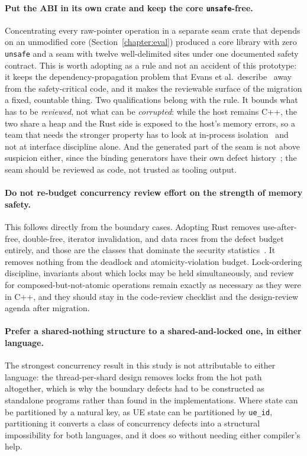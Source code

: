 \documentclass[english,twoside,openright,a4paper,censored,csm,software-track-2020]{HYthesisML}
\begin{document}
\paragraph{Put the ABI in its own crate and keep the core \texttt{unsafe}-free.}
Concentrating every raw-pointer operation in a separate seam crate that depends on an
unmodified core (Section~\ref{chapter:eval}) produced a core library with zero \texttt{unsafe}
and a seam with twelve well-delimited sites under one documented safety contract. This is
worth adopting as a rule and not an accident of this prototype: it keeps the
dependency-propagation problem that Evans et al.\ describe~\cite{evans2020rust} away from the
safety-critical code, and it makes the reviewable surface of the migration a fixed, countable
thing. Two qualifications belong with the rule. It bounds what has to be
\emph{reviewed}, not what can be \emph{corrupted}: while the host remains C++, the two share a
heap and the Rust side is exposed to the host's memory errors, so a team that needs the
stronger property has to look at in-process isolation~\cite{rivera2021galeed,kirth2022pkrusafe}
and not at interface discipline alone. And the generated part of the seam is not above
suspicion either, since the binding generators have their own defect
history~\cite{cai2026interop}; the seam should be reviewed as code, not trusted as tooling
output.

\paragraph{Do not re-budget concurrency review effort on the strength of memory safety.}
This follows directly from the boundary cases. Adopting Rust removes use-after-free,
double-free, iterator invalidation, and data races from the defect budget entirely, and those
are the classes that dominate the security statistics~\cite{msrc2019memory,google2022android}.
It removes nothing from the deadlock and atomicity-violation budget. Lock-ordering discipline,
invariants about which locks may be held simultaneously, and review for
composed-but-not-atomic operations remain exactly as necessary as they were in C++, and they
should stay in the code-review checklist and the design-review agenda after migration.

\paragraph{Prefer a shared-nothing structure to a shared-and-locked one, in either language.}
The strongest concurrency result in this study is not attributable to either language: the
thread-per-shard design removes locks from the hot path altogether, which is why the boundary
defects had to be constructed as standalone programs rather than found in the implementations.
Where state can be partitioned by a natural key, as UE state can be partitioned by
\texttt{ue\_id}, partitioning it converts a class of concurrency defects into a structural
impossibility for both languages, and it does so without needing either compiler's help.
\end{document}
